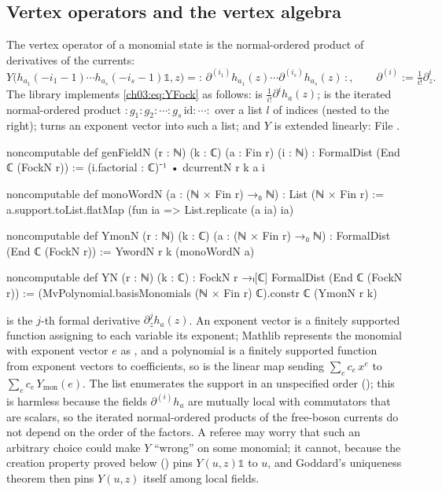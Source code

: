 \subsection{Vertex operators and the vertex algebra}

The vertex operator of a monomial state is the normal-ordered product of derivatives of the
currents:
\begin{equation}\label{ch03:eq:YFock}
  Y\bigl(h_{a_1}(-i_1-1)\cdots h_{a_s}(-i_s-1)\mathbb 1,z\bigr)
   = {:}\,\partial^{(i_1)}h_{a_1}(z)\cdots\partial^{(i_s)}h_{a_s}(z)\,{:},
  \qquad \partial^{(i)}:=\tfrac{1}{i!}\partial_z^i .
\end{equation}
The library implements \eqref{ch03:eq:YFock} as follows:  is
$\frac1{i!}\partial^ih_a(z)$;  is the iterated normal-ordered product
${:}g_1{:}g_2{:}\cdots{:}g_s\,\mathrm{id}{:}\cdots{:}$ over a list $l$ of indices (nested to the
right);  turns an exponent vector into such a list; and $Y$ is extended linearly:
\noindent File .
\begin{leancode}
noncomputable def genFieldN (r : ℕ) (k : ℂ) (a : Fin r) (i : ℕ) :
    FormalDist (End ℂ (FockN r)) :=
  (i.factorial : ℂ)⁻¹ • dcurrentN r k a i

noncomputable def monoWordN (a : (ℕ × Fin r) →₀ ℕ) : List (ℕ × Fin r) :=
  a.support.toList.flatMap (fun ia => List.replicate (a ia) ia)

noncomputable def YmonN (r : ℕ) (k : ℂ) (a : (ℕ × Fin r) →₀ ℕ) :
    FormalDist (End ℂ (FockN r)) := YwordN r k (monoWordN a)

noncomputable def YN (r : ℕ) (k : ℂ) : FockN r →ₗ[ℂ] FormalDist (End ℂ (FockN r)) :=
  (MvPolynomial.basisMonomials (ℕ × Fin r) ℂ).constr ℂ (YmonN r k)
\end{leancode}

\begin{dictionary}
 is the $j$-th formal derivative $\partial_z^jh_a(z)$. An exponent vector
 is a finitely supported function assigning to each variable its exponent;
Mathlib represents the monomial with exponent vector $e$ as , and a polynomial
is a finitely supported function from exponent vectors to coefficients, so
 is the linear map sending
$\sum_e c_e\,x^e$ to $\sum_e c_e\,Y_{\mathrm{mon}}(e)$. The list  enumerates the
support in an unspecified order (); this is harmless because the fields
$\partial^{(i)}h_a$ are mutually local with commutators that are scalars, so the iterated
normal-ordered products of the free-boson currents do not depend on the order of the factors. A
referee may worry that such an arbitrary choice could make $Y$ ``wrong'' on some monomial; it
cannot, because the creation property proved below () pins $Y(u,z)\mathbb 1$ to
$u$, and Goddard's uniqueness theorem then pins $Y(u,z)$ itself among local fields.
\end{dictionary}

